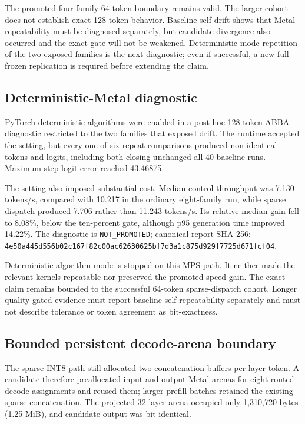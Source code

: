 The promoted four-family 64-token boundary remains valid. The larger cohort
does not establish exact 128-token behavior. Baseline self-drift shows that
Metal repeatability must be diagnosed separately, but candidate divergence also
occurred and the exact gate will not be weakened. Deterministic-mode repetition
of the two exposed families is the next diagnostic; even if successful, a new
full frozen replication is required before extending the claim.

\subsection{Deterministic-Metal diagnostic}

PyTorch deterministic algorithms were enabled in a post-hoc 128-token ABBA
diagnostic restricted to the two families that exposed drift. The runtime
accepted the setting, but every one of six repeat comparisons produced
non-identical tokens and logits, including both closing unchanged all-40
baseline runs. Maximum step-logit error reached 43.46875.

The setting also imposed substantial cost. Median control throughput was 7.130
tokens/s, compared with 10.217 in the ordinary eight-family run, while sparse
dispatch produced 7.706 rather than 11.243 tokens/s. Its relative median gain
fell to 8.08\%, below the ten-percent gate, although p95 generation time improved
14.22\%. The diagnostic is \texttt{NOT\_PROMOTED}; canonical report SHA-256:
\texttt{4e50a445d556b02c167f82c00ac62630625bf7d3a1c875d929f7725d671fcf04}.

Deterministic-algorithm mode is stopped on this MPS path. It neither made the
relevant kernels repeatable nor preserved the promoted speed gain. The exact
claim remains bounded to the successful 64-token sparse-dispatch cohort.
Longer quality-gated evidence must report baseline self-repeatability separately
and must not describe tolerance or token agreement as bit-exactness.

\subsection{Bounded persistent decode-arena boundary}

The sparse INT8 path still allocated two concatenation buffers per layer-token.
A candidate therefore preallocated input and output Metal arenas for eight
routed decode assignments and reused them; larger prefill batches retained the
existing sparse concatenation. The projected 32-layer arena occupied only
1,310,720 bytes (1.25 MiB), and candidate output was bit-identical.

